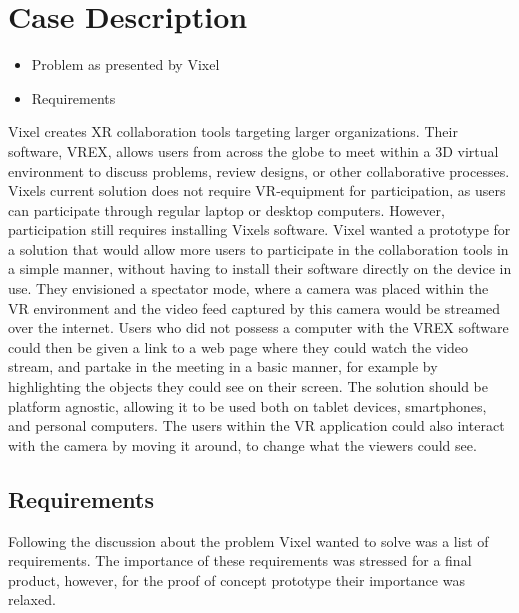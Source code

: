 \section{Case Description}
\begin{itemize}
    \item Problem as presented by Vixel
    \item Requirements \end{itemize}

Vixel\cite{vixel} creates XR collaboration tools targeting larger organizations. Their software, VREX\cite{vrex}, allows users from across the globe to meet within a 3D virtual environment to discuss problems, review designs, or other collaborative processes. Vixels current solution does not require VR-equipment for participation, as users can participate through regular laptop or desktop computers. However, participation still requires installing Vixels software. 
Vixel wanted a prototype for a solution that would allow more users to participate in the collaboration tools in a simple manner, without having to install their software directly on the device in use. They envisioned a spectator mode, where a camera was placed within the VR environment and the video feed captured by this camera would be streamed over the internet.  Users who did not possess a computer with the VREX software could then be given a link to a web page where they could watch the video stream, and partake in the meeting in a basic manner, for example by highlighting the objects they could see on their screen. The solution should be platform agnostic, allowing it to be used both on tablet devices, smartphones, and personal computers. The users within the VR application could also interact with the camera by moving it around, to change what the viewers could see.


\subsection{Requirements}
Following the discussion about the problem Vixel wanted to solve was a list of requirements. The importance of these requirements was stressed for a final product, however, for the proof of concept prototype their importance was relaxed.


